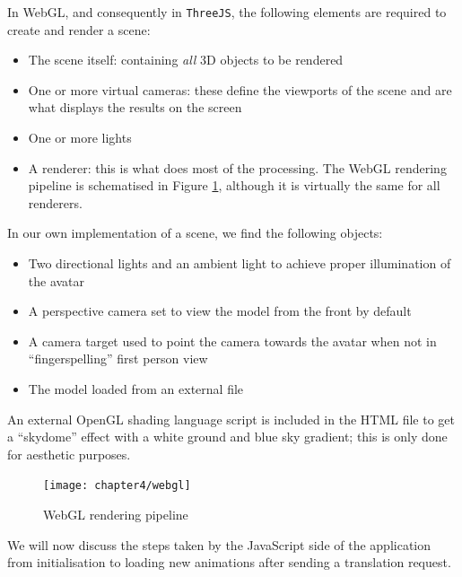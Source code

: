 \documentclass[12pt]{ociamthesis}  %
\newcommand{\tech}{\texttt}
\begin{document}
In WebGL, and consequently in \tech{ThreeJS}, the following elements are required to create and render a scene:
\begin{itemize}
	\item The scene itself: containing \textit{all} 3D objects to be rendered
	\item One or more virtual cameras: these define the viewports of the scene and are what displays the results on the screen
	\item One or more lights	
	\item A renderer: this is what does most of the processing. The WebGL rendering pipeline is schematised in Figure \ref{fig:webgl}, although it is virtually the same for all renderers.
\end{itemize}
In our own implementation of a scene, we find the following objects:
\begin{itemize}
	\item Two directional lights and an ambient light to achieve proper illumination of the avatar
	\item A perspective camera set to view the model from the front by default
	\item A camera target used to point the camera towards the avatar when not in ``fingerspelling'' first person view
	\item The model loaded from an external file
\end{itemize}
An external OpenGL shading language script is included in the HTML file to get a ``skydome'' effect with a white ground and blue sky gradient; this is only done for aesthetic purposes. 
\begin{figure}[H]
	\centering
    \texttt{[image: chapter4/webgl]}
    \caption{WebGL rendering pipeline}
    \label{fig:webgl}
\end{figure}	
We will now discuss the steps taken by the JavaScript side of the application from initialisation to loading new animations after sending a translation request.
\end{document}
